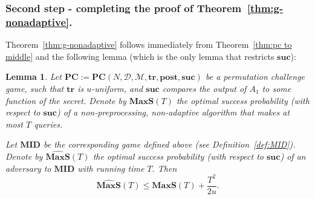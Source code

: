 \documentclass[11pt]{article}
\newtheorem{lemma}[theorem]{Lemma}
\newcommand{\SECS}{{\mathcal{D}}}
\newcommand{\SUC}{\boldsymbol{suc}}
\newcommand{\TR}{\boldsymbol{tr}}
\newcommand{\POST}{\boldsymbol{post}}
\newcommand{\PC}{\boldsymbol{PC}}
\newcommand{\MID}{\boldsymbol{MID}}
\newcommand{\MAXS}{\boldsymbol{MaxS}}
\begin{document}
\subsubsection{Second step - completing the proof of Theorem~\ref{thm:g-nonadaptive}.}
Theorem~\ref{thm:g-nonadaptive} follows immediately from Theorem~\ref{thm:pc to middle} and the following lemma
(which is the only lemma that restricts $\SUC$):
\begin{lemma}\label{lem:middle to non preprocess}
    Let $\PC := \PC(N,\SECS,\mathcal{M},\TR,\POST,\SUC)$ be a permutation challenge game, such that $\TR$ is $u$-uniform,
    and $\SUC$ compares the output of $A_1$ to some function of the secret.
    Denote by $\MAXS(T)$ the optimal success probability (with respect to $\SUC$) of a non-preprocessing, non-adaptive algorithm that makes at most $T$ queries.

    Let $\MID$ be the corresponding game defined above (see Definition~\ref{def:MID}).
    Denote by $\widehat{\MAXS}(T)$ the optimal success probability (with respect to $\SUC$) of an adversary to $\MID$ with running time $T$. Then $$\widehat{\MAXS}(T) \le \MAXS(T) + \frac{T^2}{2u}.$$
\end{lemma}
\end{document}
